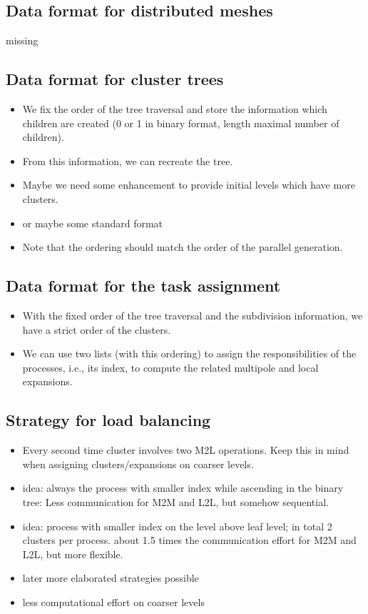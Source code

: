\documentclass[a4paper]{scrartcl}
\begin{document}
\subsection{Data format for distributed meshes }
missing

\subsection{Data format for cluster trees}
\begin{itemize}
\item We fix the order of the tree traversal and store the information which children are
created (0 or 1 in binary format, length maximal number of children).
\item From this information, we can recreate the tree.
\item Maybe we need some enhancement to provide initial levels which have more
  clusters.
\item or maybe some standard format
\item Note that the ordering should match the order of the parallel generation.
\end{itemize}

\subsection{Data format for the  task assignment}
\begin{itemize}
\item With the fixed order of the tree traversal and the subdivision information, we
  have a strict order of the clusters.
\item We can use two lists (with this ordering) to assign the responsibilities
  of the processes, i.e., its index, to compute the related multipole and local expansions. 
\end{itemize}


\subsection{Strategy for load balancing}
\begin{itemize}
\item Every second time cluster involves two M2L operations. Keep this in mind
  when assigning clusters/expansions on coarser levels.
\item idea: always the process with smaller index while ascending in the binary
  tree: Less communication for M2M and L2L, but somehow sequential.
\item idea: process with smaller index on the level above leaf level; in total
  2 clusters per process.
  about 1.5 times the communication effort for M2M and L2L, but more flexible.
\item later more elaborated strategies possible
\item less computational effort on coarser levels
\end{itemize}
\end{document}
